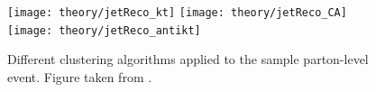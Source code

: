 \begin{figure}[htp]
\centering
\texttt{[image: theory/jetReco\_kt]}\hfill
\texttt{[image: theory/jetReco\_CA]}\hfill
\texttt{[image: theory/jetReco\_antikt]}\hfill
\caption{Different clustering algorithms applied to the sample parton-level event.
Figure taken from \cite{Cacciari:2008gp}.}
\label{fig:JetClustering}
\end{figure}



%
%
%
%
%
